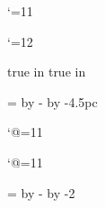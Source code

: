 \newdimen\leading \leading=15pt

%
%

\catcode`\@=11

\newdimen\textblock@odd@left
\newdimen\textblock@even@left

\def\setspinemargin#1{
  \textblock@odd@left=#1
  \textblock@even@left=\pdfpagewidth
    \advance\textblock@even@left by -\hsize
    \advance\textblock@even@left by -#1
}

\catcode`\@=12

\pdfhorigin=0pt
\pdfvorigin=0pt
 true in
 true in
\hsize=22pc
\vsize=39pc
\voffset=4.5pc

\setspinemargin{4.5pc}

%
%

\newif\ifclearedpage
\newif\ifdisplaypage

\catcode`@=11

\def\facingpages{%
  \ifclearedpage\headline={\line{}}\footline={\line{}}\fi%
  \ifdisplaypage\headline={\line{}}\footline={\displaypagefootline}\fi%
  \global\clearedpagefalse%
  \global\displaypagefalse%
  \dimen0=\ifodd\pageno\textblock@odd@left\else\textblock@even@left\fi%
  \shipout\vbox{\moveright\dimen0\vbox{\makeheadline\pagebody\makefootline}}%
  \advancepageno%
  \ifnum\outputpenalty>-20000 \else\dosupereject\fi%
}
\catcode`@=11

\output{\facingpages}

\newdimen\headlineskip
\headlineskip=\topskip
\advance\headlineskip by -\runningheadersize
\advance\headlineskip by -2\leading

\def\makeheadline{\vbox to 0pt{\vskip\headlineskip\line{\vbox to\runningheadersize{}\the\headline}\vss\nointerlineskip}}
\def\makefootline{\baselineskip=2\leading\lineskiplimit=0pt\line{\the\footline}}

%
%

